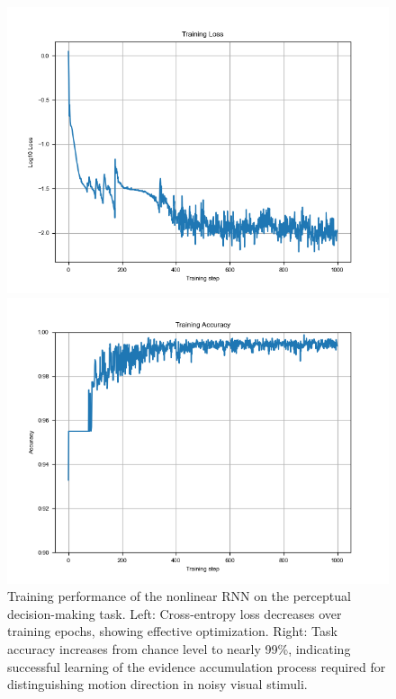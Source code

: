 \documentclass[11pt]{article}
\begin{document}
\begin{figure}[h]
\centering
\begin{minipage}{0.48\textwidth}
    \centering
    \includegraphics[width=\textwidth]{training_loss.png}
\end{minipage}
\hfill
\begin{minipage}{0.48\textwidth}
    \centering
    \includegraphics[width=\textwidth]{training_accuracy.png}
\end{minipage}
\caption{Training performance of the nonlinear RNN on the perceptual decision-making task. Left: Cross-entropy loss decreases over training epochs, showing effective optimization. Right: Task accuracy increases from chance level to nearly 99\%, indicating successful learning of the evidence accumulation process required for distinguishing motion direction in noisy visual stimuli.}
\label{fig:training_performance}
\end{figure}
\end{document}
